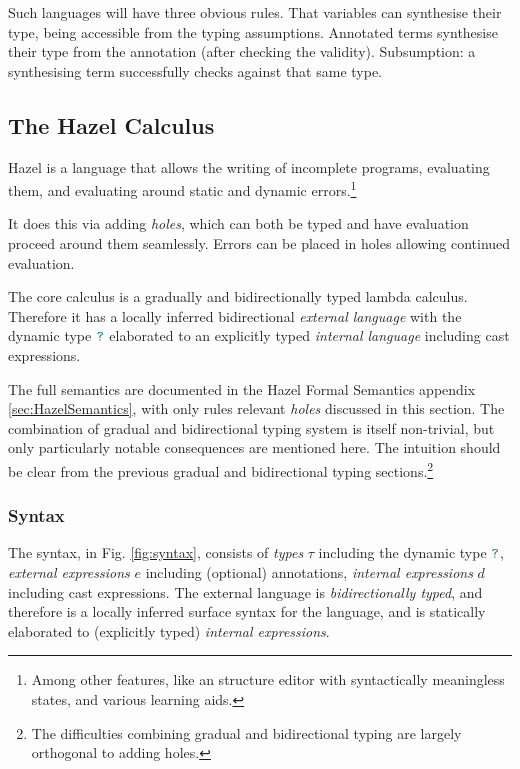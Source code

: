 Such languages will have three obvious rules. That variables can synthesise their type, being accessible from the typing assumptions. Annotated terms synthesise their type from the annotation (after checking the validity). Subsumption: a synthesising term successfully checks against that same type.

\subsection{The Hazel Calculus}\label{sec:CoreHazel}
Hazel is a language that allows the writing of incomplete programs, evaluating them, and evaluating around static and dynamic errors.\footnote{Among other features, like an structure editor with syntactically meaningless states, and various learning aids.}

It does this via adding \textit{holes}, which can both be typed and have evaluation proceed around them seamlessly. Errors can be placed in holes allowing continued evaluation.

The core calculus \cite{HazelLivePaper} is a gradually and bidirectionally typed lambda calculus. Therefore it has a locally inferred bidirectional \textit{external language} with the dynamic type ${\color{teal}\texttt{?}}$ elaborated to an explicitly typed \textit{internal language} including cast expressions. 

The full semantics are documented in the Hazel Formal Semantics appendix \ref{sec:HazelSemantics}, with only rules relevant \textit{holes} discussed in this section. The combination of gradual and bidirectional typing system is itself non-trivial, but only particularly notable consequences are mentioned here. The intuition should be clear from the previous gradual and bidirectional typing sections.\footnote{The difficulties combining gradual and bidirectional typing are largely orthogonal to adding holes.}

\subsubsection{Syntax}\label{sec:HazelSyntax}
\par The syntax, in Fig. \ref{fig:syntax}, consists of \textit{types} $\tau$ including the dynamic type ${\color{teal}\texttt{?}}$, \textit{external expressions} $e$ including (optional) annotations, \textit{internal expressions} $d$ including cast expressions. The external language is \textit{bidirectionally typed}, and therefore is a locally inferred surface syntax for the language, and is statically elaborated to (explicitly typed) \textit{internal expressions}.

